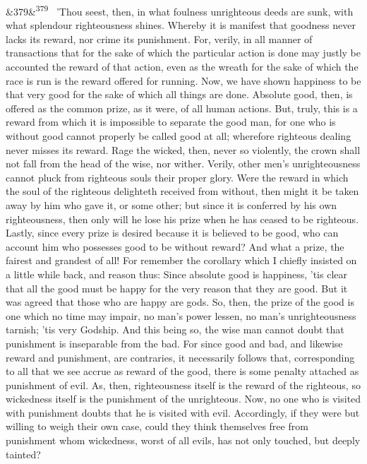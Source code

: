 \documentclass[12pt]{article}
\newcommand{\para}[1][]{\par\noindent\ifx&#1&\else\textsuperscript{\footnotesize #1}~\fi}
\begin{document}
\para[379] 'Thou seest, then, in what foulness unrighteous deeds are sunk, with what splendour righteousness shines. Whereby it is manifest that goodness never lacks its reward, nor crime its punishment. For, verily, in all manner of transactions that for the sake of which the particular action is done may justly be accounted the reward of that action, even as the wreath for the sake of which the race is run is the reward offered for running. Now, we have shown happiness to be that very good for the sake of which all things are done. Absolute good, then, is offered as the common prize, as it were, of all human actions. But, truly, this is a reward from which it is impossible to separate the good man, for one who is without good cannot properly be called good at all; wherefore righteous dealing never misses its reward. Rage the wicked, then, never so violently, the crown shall not fall from the head of the wise, nor wither. Verily, other men's unrighteousness cannot pluck from righteous souls their proper glory. Were the reward in which the soul of the righteous delighteth received from without, then might it be taken away by him who gave it, or some other; but since it is conferred by his own righteousness, then only will he lose his prize when he has ceased to be righteous. Lastly, since every prize is desired because it is believed to be good, who can account him who possesses good to be without reward? And what a prize, the fairest and grandest of all! For remember the corollary which I chiefly insisted on a little while back, and reason thus: Since absolute good is happiness, 'tis clear that all the good must be happy for the very reason that they are good. But it was agreed that those who are happy are gods. So, then, the prize of the good is one which no time may impair, no man's power lessen, no man's unrighteousness tarnish; 'tis very Godship. And this being so, the wise man cannot doubt that punishment is inseparable from the bad. For since good and bad, and likewise reward and punishment, are contraries, it necessarily follows that, corresponding to all that we see accrue as reward of the good, there is some penalty attached as punishment of evil. As, then, righteousness itself is the reward of the righteous, so wickedness itself is the punishment of the unrighteous. Now, no one who is visited with punishment doubts that he is visited with evil. Accordingly, if they were but willing to weigh their own case, could they think themselves free from punishment whom wickedness, worst of all evils, has not only touched, but deeply tainted?
\end{document}
